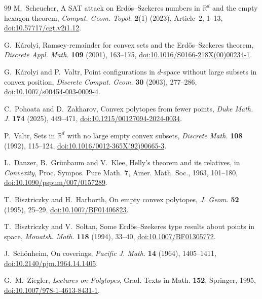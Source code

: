 \documentclass[aps,prd,twocolumn,superscriptaddress,nofootinbib,longbibliography,floatfix,showkeys,amsmath,amssymb,10pt]{revtex4-2}
\theoremstyle{plain}
\theoremstyle{definition}
\theoremstyle{plain}
\newcommand{\R}{\mathbb{R}}
\begin{document}
\begin{thebibliography}{99}
 M.~Scheucher, A SAT attack on Erd\H{o}s--Szekeres numbers in $\R^d$ and the empty hexagon theorem, \emph{Comput. Geom. Topol.} \textbf{2}(1) (2023), Article~2, 1--13, \href{https://doi.org/10.57717/cgt.v2i1.12}{doi:10.57717/cgt.v2i1.12}.

 G.~K\'arolyi, Ramsey-remainder for convex sets and the Erd\H{o}s--Szekeres theorem, \emph{Discrete Appl. Math.} \textbf{109} (2001), 163--175, \href{https://doi.org/10.1016/S0166-218X(00)00234-1}{doi:10.1016/S0166-218X(00)00234-1}.

 G.~K\'arolyi and P.~Valtr, Point configurations in $d$-space without large subsets in convex position, \emph{Discrete Comput. Geom.} \textbf{30} (2003), 277--286, \href{https://doi.org/10.1007/s00454-003-0009-4}{doi:10.1007/s00454-003-0009-4}.

 C.~Pohoata and D.~Zakharov, Convex polytopes from fewer points, \emph{Duke Math. J.} \textbf{174} (2025), 449--471, \href{https://doi.org/10.1215/00127094-2024-0034}{doi:10.1215/00127094-2024-0034}.

 P.~Valtr, Sets in $\R^d$ with no large empty convex subsets, \emph{Discrete Math.} \textbf{108} (1992), 115--124, \href{https://doi.org/10.1016/0012-365X(92)90665-3}{doi:10.1016/0012-365X(92)90665-3}.

 L.~Danzer, B.~Gr\"unbaum and V.~Klee, Helly's theorem and its relatives, in \emph{Convexity}, Proc. Sympos. Pure Math. \textbf{7}, Amer. Math. Soc., 1963, 101--180, \href{https://doi.org/10.1090/pspum/007/0157289}{doi:10.1090/pspum/007/0157289}.

 T.~Bisztriczky and H.~Harborth, On empty convex polytopes, \emph{J. Geom.} \textbf{52} (1995), 25--29, \href{https://doi.org/10.1007/BF01406823}{doi:10.1007/BF01406823}.

 T.~Bisztriczky and V.~Soltan, Some Erd\H{o}s--Szekeres type results about points in space, \emph{Monatsh. Math.} \textbf{118} (1994), 33--40, \href{https://doi.org/10.1007/BF01305772}{doi:10.1007/BF01305772}.

 J.~Sch\"onheim, On coverings, \emph{Pacific J. Math.} \textbf{14} (1964), 1405--1411, \href{https://doi.org/10.2140/pjm.1964.14.1405}{doi:10.2140/pjm.1964.14.1405}.

 G.~M.~Ziegler, \emph{Lectures on Polytopes}, Grad. Texts in Math. \textbf{152}, Springer, 1995, \href{https://doi.org/10.1007/978-1-4613-8431-1}{doi:10.1007/978-1-4613-8431-1}.


\end{thebibliography}
\end{document}
